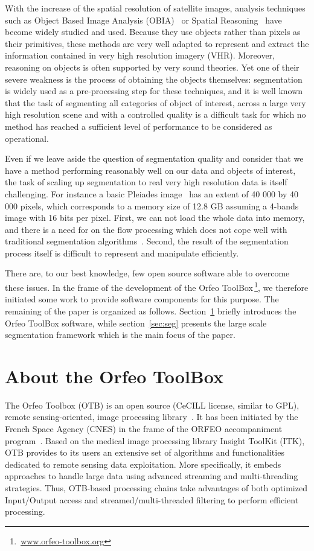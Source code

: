 \documentclass{josis}
\newcommand{\furl}[1]{$\,$\footnote{$\,$\url{#1}}}
\begin{document}
With the increase of the spatial resolution of satellite images,
analysis techniques such as Object Based Image Analysis
(OBIA)~\cite{michel2010lazy} or Spatial
Reasoning~\cite{inglada2009qualitative,vanegas2009fuzzy,vanegas2010detection}
have become widely studied and used. Because they use objects rather
than pixels as their primitives, these methods are very well adapted
to represent and extract the information contained in very high
resolution imagery (VHR). Moreover, reasoning on objects is often
supported by very sound theories. Yet one of their severe weakness is
the process of obtaining the objects themselves: segmentation is
widely used as a pre-processing step for these techniques, and it is
well known that the task of segmenting all categories of object of
interest, across a large very high resolution scene and with a
controlled quality is a difficult task for which no method has reached
a sufficient level of performance to be considered as operational.

Even if we leave aside the question of segmentation quality and
consider that we have a method performing reasonably well on our data
and objects of interest, the task of scaling up segmentation to real
very high resolution data is itself challenging.  For instance a basic
Pleiades image~\cite{tinel2012orfeo} has an extent of 40 000 by 40 000
pixels, which corresponds to a memory size of 12.8 GB assuming a
4-bands image with 16 bits per pixel. First, we can not load the
whole data into memory, and there is a need for on the flow processing
which does not cope well with traditional segmentation
algorithms~\cite{shi2000normalized}. Second, the result of the
segmentation process itself is difficult to represent and manipulate
efficiently.

There are, to our best knowledge, few open source software able to
overcome these issues. In the frame of the development of the Orfeo
ToolBox\furl{www.orfeo-toolbox.org}, we therefore initiated some work
to provide software components for this purpose. The remaining of the
paper is organized as follows. Section~\ref{sec:otb} briefly
introduces the Orfeo ToolBox software, while section~\ref{sec:seg}
presents the large scale segmentation framework which is the main
focus of the paper.

\section{About the Orfeo ToolBox}\label{sec:otb}

The Orfeo Toolbox (OTB) is an open source (CeCILL license, similar to GPL), remote
sensing-oriented, image processing library~\cite{inglada2009orfeo}. It
has been initiated by the French Space Agency (CNES) in the frame of
the ORFEO accompaniment program~\cite{tinel2012orfeo}. Based on the
medical image processing library Insight ToolKit (ITK), OTB
provides to its users an extensive set of algorithms and
functionalities dedicated to remote sensing data exploitation. More
specifically, it embeds approaches to handle large data using
advanced streaming and multi-threading strategies. Thus, OTB-based
processing chains take advantages of both optimized Input/Output
access and streamed/multi-threaded filtering to perform efficient
processing.
\end{document}
